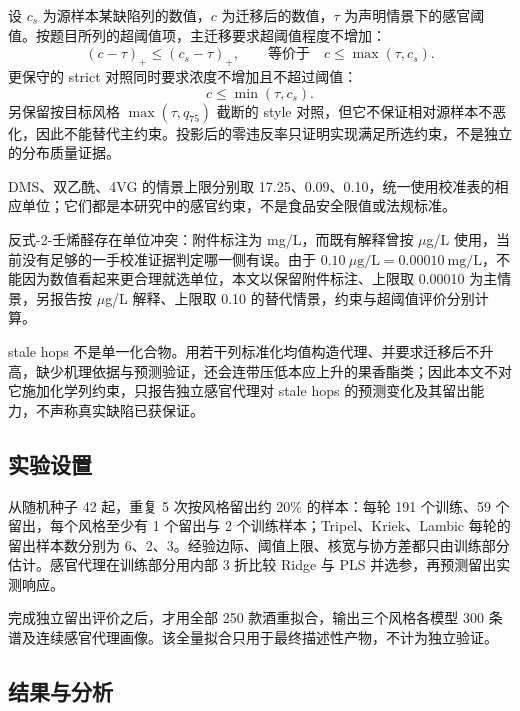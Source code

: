 \documentclass[UTF8,a4paper,zihao=-4]{ctexart}
\numberwithin{figure}{section}
\numberwithin{table}{section}
\numberwithin{equation}{section}
\begin{document}
设 $c_s$ 为源样本某缺陷列的数值，$c$ 为迁移后的数值，$\tau$ 为声明情景下的感官阈值。按题目所列的超阈值项，主迁移要求超阈值程度不增加：
\begin{equation}
\left(c-\tau\right)_{+}\le\left(c_s-\tau\right)_{+},\qquad\text{等价于}\quad c\le\max\left(\tau,c_s\right).
\label{eq:defect-main}
\end{equation}
更保守的 strict 对照同时要求浓度不增加且不超过阈值：
\begin{equation}
c\le\min\left(\tau,c_s\right).
\label{eq:defect-strict}
\end{equation}
另保留按目标风格 $\max(\tau,q_{75})$ 截断的 style 对照，但它不保证相对源样本不恶化，因此不能替代主约束。投影后的零违反率只证明实现满足所选约束，不是独立的分布质量证据。

DMS、双乙酰、4VG 的情景上限分别取 17.25、0.09、0.10，统一使用校准表的相应单位；它们都是本研究中的感官约束，不是食品安全限值或法规标准。

反式-2-壬烯醛存在单位冲突：附件标注为 mg/L，而既有解释曾按 $\mu$g/L 使用，当前没有足够的一手校准证据判定哪一侧有误。由于 $0.10\ \mu\mathrm{g/L}=0.00010\ \mathrm{mg/L}$，不能因为数值看起来更合理就选单位，本文以保留附件标注、上限取 0.00010 为主情景，另报告按 $\mu$g/L 解释、上限取 0.10 的替代情景，约束与超阈值评价分别计算。

stale hops 不是单一化合物。用若干列标准化均值构造代理、并要求迁移后不升高，缺少机理依据与预测验证，还会连带压低本应上升的果香酯类；因此本文不对它施加化学列约束，只报告独立感官代理对 stale hops 的预测变化及其留出能力，不声称真实缺陷已获保证。

\subsection{实验设置}

从随机种子 42 起，重复 5 次按风格留出约 20\% 的样本：每轮 191 个训练、59 个留出，每个风格至少有 1 个留出与 2 个训练样本；Tripel、Kriek、Lambic 每轮的留出样本数分别为 6、2、3。经验边际、阈值上限、核宽与协方差都只由训练部分估计。感官代理在训练部分用内部 3 折比较 Ridge 与 PLS 并选参，再预测留出实测响应。

完成独立留出评价之后，才用全部 250 款酒重拟合，输出三个风格各模型 300 条谱及连续感官代理画像。该全量拟合只用于最终描述性产物，不计为独立验证。

\subsection{结果与分析}
\end{document}
